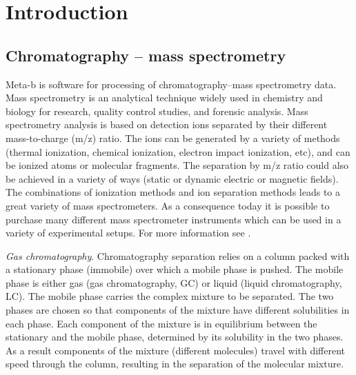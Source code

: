 

\chapter{Introduction}

\section{Chromatography -- mass spectrometry}

Meta-b is software for processing of chromatography--mass spectrometry
data. Mass spectrometry is an analytical technique widely used in chemistry
and biology for research, quality control studies, and forensic analysis.
Mass spectrometry analysis is based on detection ions separated by 
their different mass-to-charge (m/z) ratio. The ions can be generated
by a variety of methods (thermal ionization, chemical ionization,
electron impact ionization, etc), and can be ionized atoms or molecular
fragments. The separation by m/z ratio could also be achieved in a
variety of ways (static or dynamic electric or magnetic fields). The
combinations of ionization methods and ion separation methods leads
to a great variety of mass spectrometers. As a consequence today it
is possible to purchase many different mass spectrometer instruments
which can be used in a variety of experimental setups. For more
information see \cite{gross04}.

{\em Gas chromatography}.
Chromatography separation relies on a column packed with a stationary
phase (immobile) over which a mobile phase is pushed. The mobile phase
is either gas (gas chromatography, GC) or liquid (liquid chromatography,
LC). The mobile phase carries the complex mixture to be separated. The
two phases are chosen so that components of the mixture have different
solubilities in each phase. Each component of the mixture is in
equilibrium between the stationary and the mobile phase, determined
by its solubility in the two phases. As a result components of the
mixture (different molecules) travel with different speed through
the column, resulting in the separation of the molecular mixture.

